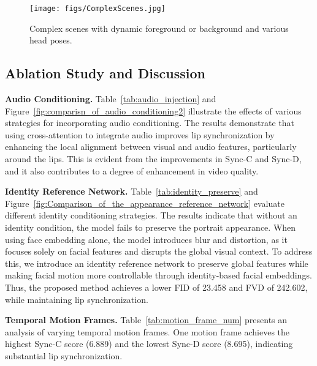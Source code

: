 \begin{figure}[t!]
    \centering
    \texttt{[image: figs/ComplexScenes.jpg]}
    \vspace{-6mm}
    \caption{Complex scenes with dynamic foreground or background and various head poses.}
    \label{fig:ComplexScenes}
    \vspace{-2mm}
\end{figure}










\subsection{Ablation Study and Discussion}
\label{sec:ablationstudy}
\noindent\textbf{Audio Conditioning.} {Table~\ref{tab:audio_injection} and Figure~\ref{fig:comparisn_of_audio_conditioning2} illustrate the effects of various strategies for incorporating audio conditioning. The results demonstrate that using cross-attention to integrate audio improves lip synchronization by enhancing the local alignment between visual and audio features, particularly around the lips. This is evident from the improvements in Sync-C and Sync-D, and it also contributes to a degree of enhancement in video quality.}

\noindent\textbf{Identity Reference Network.} {
Table~\ref{tab:identity_preserve} and Figure~\ref{fig:Comparison_of_the_appearance_reference_network} evaluate different identity conditioning strategies.  The results indicate that without an identity condition, the model fails to preserve the portrait appearance. When using face embedding alone, the model introduces blur and distortion, as it focuses solely on facial features and disrupts the global visual context. To address this, we introduce an identity reference network to preserve global features while making facial motion more controllable through identity-based facial embeddings. Thus, the proposed method achieves a lower FID of 23.458 and FVD of 242.602, while maintaining lip synchronization.
}

\noindent\textbf{Temporal Motion Frames.} {Table~\ref{tab:motion_frame_num} presents an analysis of varying temporal motion frames. One motion frame achieves the highest Sync-C score (6.889) and the lowest Sync-D score (8.695), indicating substantial lip synchronization.}

